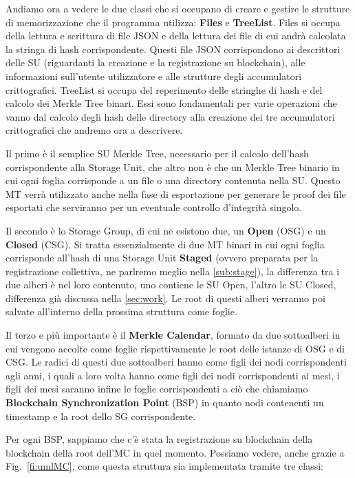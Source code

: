 Andiamo ora a vedere le due classi che si occupano di creare e gestire le strutture di memorizzazione che il programma utilizza: \textbf{Files} e \textbf{TreeList}.
Files si occupa della lettura e scrittura di file JSON e della lettura dei file di cui andrà calcolata la stringa di hash corrispondente. Questi file JSON corrispondono ai descrittori delle SU (riguardanti la creazione e la registrazione su blockchain), alle informazioni sull’utente utilizzatore e alle strutture degli accumulatori crittografici.
TreeList si occupa del reperimento delle stringhe di hash e del calcolo dei Merkle Tree binari.
Essi sono fondamentali per varie operazioni che vanno dal calcolo degli hash delle directory alla creazione dei tre accumulatori crittografici che andremo ora a descrivere.

Il primo è il semplice SU Merkle Tree, necessario per il calcolo dell’hash corrispondente alla Storage Unit, che altro non è che un Merkle Tree binario in cui ogni foglia corrisponde a un file o una directory contenuta nella SU. Questo MT verrà utilizzato anche nella fase di esportazione per generare le proof dei file esportati che serviranno per un eventuale controllo d’integrità singolo.

Il secondo è lo Storage Group, di cui ne esistono due, un \textbf{Open} (OSG) e un \textbf{Closed} (CSG). Si tratta essenzialmente di due MT binari in cui ogni foglia corrisponde all’hash di una Storage Unit \textbf{Staged} (ovvero preparata per la registrazione collettiva, ne parlremo meglio nella \autoref{sub:stage}), la differenza tra i due alberi è nel loro contenuto, uno contiene le SU Open, l’altro le SU Closed, differenza già discussa nella \autoref{sec:work}. Le root di questi alberi verranno poi salvate all’interno della prossima struttura come foglie.

Il terzo e più importante è il \textbf{Merkle Calendar}, formato da due sottoalberi in cui vengono accolte come foglie rispettivamente le root delle istanze di OSG e di CSG. Le radici di questi due sottoalberi hanno come figli dei nodi corrispondenti agli anni, i quali a loro volta hanno come figli dei nodi corrispondenti ai mesi, i figli dei mesi saranno infine le foglie corrispondenti a ciò che chiamiamo \textbf{Blockchain Synchronization Point} (BSP) in quanto nodi contenenti un timestamp e la root dello SG corrispondente.

Per ogni BSP, sappiamo che c'è stata la registrazione su blockchain della blockchain
della root dell'MC in quel momento.
Possiamo vedere, anche grazie a Fig.~\ref{fi:umlMC}, come questa struttura sia implementata tramite tre classi:


